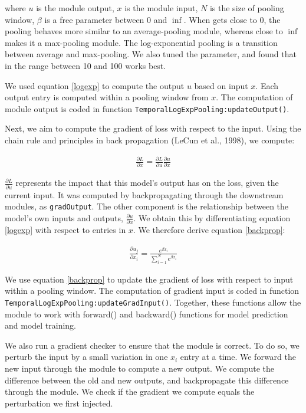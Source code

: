 \documentclass{article}
\begin{document}
where $u$ is the module output, $x$ is the module input, $N$ is the size of pooling window, $\beta$ is a free parameter between 0 and $\inf$. When  gets close to 0, the pooling behaves more similar to an average-pooling module, whereas close to $\inf$ makes it a max-pooling module. The log-exponential pooling is a transition between average and max-pooling. We also tuned the  parameter, and found that  in the range between 10 and 100 works best. 

We used equation \ref{logexp} to compute the output $u$ based on input $x$. Each output entry is computed within a pooling window from $x$. The computation of module output is coded in function \texttt{TemporalLogExpPooling:updateOutput()}. 

Next, we aim to compute the gradient of loss with respect to the input. Using the chain rule and principles in back propagation (LeCun et al., 1998), we compute:

\begin{align}
\frac{\partial L}{\partial x} = \frac{\partial L}{\partial u} \frac{\partial u}{\partial x}
\label{chainrule}
\end{align}

$\frac{\partial L}{\partial u}$ represents the impact that this model's output has on the loss, given the current input. It was computed by backpropagating through the downstream modules, as \texttt{gradOutput}. The other component is the relationship between the model's own inputs and outputs, $\frac{\partial u}{\partial x}$. We obtain this by differentiating equation \ref{logexp} with respect to entries in $x$. We therefore derive equation \ref{backprop}:

\begin{align}
\frac{\partial u_j}{\partial x_i} = \frac{e^{\beta x_i}}{\sum\limits_{i=1}^{N} e^{\beta x_i}}
\label{backprop}
\end{align}

We use equation \ref{backprop} to update the gradient of loss with respect to input within a pooling window. The computation of gradient input is coded in function \texttt{TemporalLogExpPooling:updateGradInput()}. Together, these functions allow the module to work with forward() and backward() functions for model prediction and model training. 

We also run a gradient checker to ensure that the module is correct. To do so, we perturb the input by a small variation in one $x_i$ entry at a time. We forward the new input through the module to compute a new output. We compute the difference between the old and new outputs, and backpropagate this difference through the module. We check if the gradient we compute equals the perturbation we first injected. 
\end{document}

